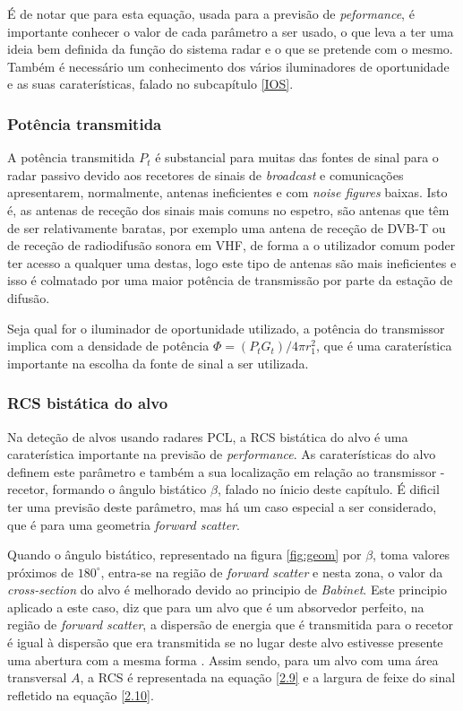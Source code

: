 É de notar que para esta equação, usada para a previsão de \textit{peformance}, é importante conhecer o valor de cada parâmetro a ser usado, o que leva a ter uma ideia bem definida da função do sistema radar e o que se pretende com o mesmo. Também é necessário um conhecimento dos vários iluminadores de oportunidade e as suas caraterísticas, falado no subcapítulo \ref{IOS}.\par 


\subsubsection*{Potência transmitida}
A potência transmitida $P_{t}$ é substancial para muitas das fontes de sinal para o radar passivo devido aos recetores de sinais de \textit{broadcast} e comunicações apresentarem, normalmente, antenas ineficientes e com \textit{noise figures} baixas. Isto é, as antenas de receção dos sinais mais comuns no espetro, são antenas que têm de ser relativamente baratas, por exemplo uma antena de receção de \gls{DVB-T} ou de receção de radiodifusão sonora em \gls{VHF}, de forma a o utilizador comum poder ter acesso a qualquer uma destas, logo este tipo de antenas são mais ineficientes e isso é colmatado por uma maior potência de transmissão por parte da estação de difusão.\par 
Seja qual for o iluminador de oportunidade utilizado, a potência do transmissor implica com a densidade de potência $\Phi =(P_{t}G_{t})/4\pi r^{2}_{1}$, que é uma caraterística importante na escolha da fonte de sinal a ser utilizada. 

\subsubsection*{\gls{RCS} bistática do alvo}
Na deteção de alvos usando radares \gls{PCL}, a \gls{RCS} bistática do alvo é uma caraterística importante na previsão de \textit{performance}. As caraterísticas do alvo definem este parâmetro e também a sua localização em relação ao transmissor - recetor, formando o ângulo bistático $\beta$, falado no ínicio deste capítulo. É dificil ter uma previsão deste parâmetro, mas há um caso especial a ser considerado, que é para uma geometria \textit{forward scatter}. \par 
Quando o ângulo bistático, representado na figura \ref{fig:geom} por $\beta$, toma valores próximos de $180^{\circ}$, entra-se na região de \textit{forward scatter} e nesta zona, o valor da \textit{cross-section} do alvo é melhorado devido ao principio de \textit{Babinet}. Este principio aplicado a este caso, diz que para um alvo que é um absorvedor perfeito, na região de \textit{forward scatter}, a dispersão de energia que é transmitida para o recetor é igual à dispersão que era transmitida se no lugar deste alvo estivesse presente uma abertura com a mesma forma \parencite{Griffiths2005}. Assim sendo, para um alvo com uma área transversal $A$, a \gls{RCS} é representada na equação \ref{2.9} e a largura de feixe do sinal refletido na equação \ref{2.10}.

